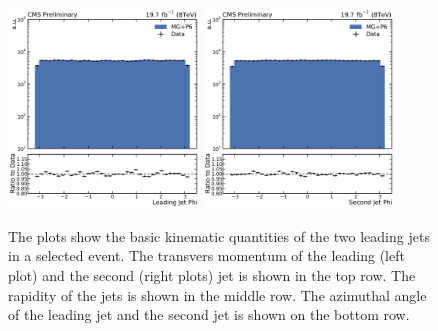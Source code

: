 \begin{figure}[htbp]
    \includegraphics[width=0.45\textwidth]{figures/measurement/jet1phi_default.pdf}\hfill
    \includegraphics[width=0.45\textwidth]{figures/measurement/jet2phi_default.pdf}
    \caption{The plots show the basic kinematic quantities of the two leading jets in a selected event.
             The transvers momentum of the leading (left plot) and the second (right plots) jet is shown
         in the top row. The rapidity of the jets is shown in the middle row. The azimuthal angle of the
     leading jet and the second jet is shown on the bottom row.}
    \label{fig:controlplots:kinematic}
\end{figure}

